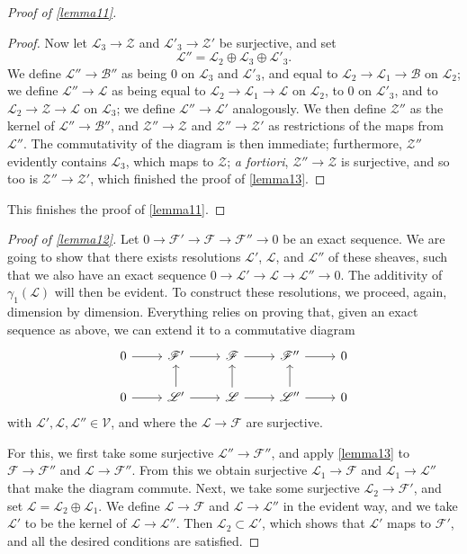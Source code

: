\documentclass{article}
\theoremstyle{plain}
\theoremstyle{definition}
\newcommand{\sh}[1]{{\mathscr{#1}}}
\newcommand{\cat}[1]{{\mathcal{#1}}}
\begin{document}
\begin{proof}[Proof of \cref{lemma11}]
\begin{proof}
    Now let $\sh{L}_3\to\sh{Z}$ and $\sh{L}'_3\to\sh{Z}'$ be surjective, and set
    \[
      \sh{L}'' = \sh{L}_2\oplus\sh{L}_3\oplus\sh{L}'_3.
    \]
    We define $\sh{L}''\to\sh{B}''$ as being $0$ on $\sh{L}_3$ and $\sh{L}'_3$, and equal to $\sh{L}_2\to\sh{L}_1\to\sh{B}$ on $\sh{L}_2$;
    we define $\sh{L}''\to\sh{L}$ as being equal to $\sh{L}_2\to\sh{L}_1\to\sh{L}$ on $\sh{L}_2$, to $0$ on $\sh{L}'_3$, and to $\sh{L}_2\to\sh{Z}\to\sh{L}$ on $\sh{L}_3$;
    we define $\sh{L}''\to\sh{L}'$ analogously.
    We then define $\sh{Z}''$ as the kernel of $\sh{L}''\to\sh{B}''$, and $\sh{Z}''\to\sh{Z}$ and $\sh{Z}''\to\sh{Z}'$ as restrictions of the maps from $\sh{L}''$.
    The commutativity of the diagram is then immediate;
    furthermore, $\sh{Z}''$ evidently contains $\sh{L}_3$, which maps to $\sh{Z}$;
    \emph{a fortiori}, $\sh{Z}''\to\sh{Z}$ is surjective, and so too is $\sh{Z}''\to\sh{Z}'$, which finished the proof of \cref{lemma13}.
  \end{proof}
  This finishes the proof of \cref{lemma11}.
\end{proof}

\begin{proof}[Proof of \cref{lemma12}]
  Let $0\to\sh{F}'\to\sh{F}\to\sh{F}''\to0$ be an exact sequence.
  We are going to show that there exists resolutions $\sh{L}'$, $\sh{L}$, and $\sh{L}''$ of these sheaves, such that we also have an exact sequence $0\to\sh{L}'\to\sh{L}\to\sh{L}''\to0$.
  The additivity of $\gamma_1(\sh{L})$ will then be evident.
  To construct these resolutions, we proceed, again, dimension by dimension.
  Everything relies on proving that, given an exact sequence as above, we can extend it to a commutative diagram
  \[
    \begin{tikzcd}
      0 \rar
      & \sh{F}' \rar
      & \sh{F} \rar
      & \sh{F}'' \rar
      & 0
    \\0 \rar
      & \sh{L}' \rar\uar
      & \sh{L} \rar\uar
      & \sh{L}'' \rar\uar
      & 0
    \end{tikzcd}
  \]
  with $\sh{L}',\sh{L},\sh{L}''\in\cat{V}$, and where the $\sh{L}\to\sh{F}$ are surjective.

  For this, we first take some surjective $\sh{L}''\to\sh{F}''$, and apply \cref{lemma13} to $\sh{F}\to\sh{F}''$ and $\sh{L}\to\sh{F}''$.
  From this we obtain surjective $\sh{L}_1\to\sh{F}$ and $\sh{L}_1\to\sh{L}''$ that make the diagram commute.
  Next, we take some surjective $\sh{L}_2\to\sh{F}'$, and set $\sh{L}=\sh{L}_2\oplus\sh{L}_1$.
  We define $\sh{L}\to\sh{F}$ and $\sh{L}\to\sh{L}''$ in the evident way, and we take $\sh{L}'$ to be the kernel of $\sh{L}\to\sh{L}''$.
  Then $\sh{L}_2\subset\sh{L}'$, which shows that $\sh{L}'$ maps to $\sh{F}'$, and all the desired conditions are satisfied.
\end{proof}
\end{document}
